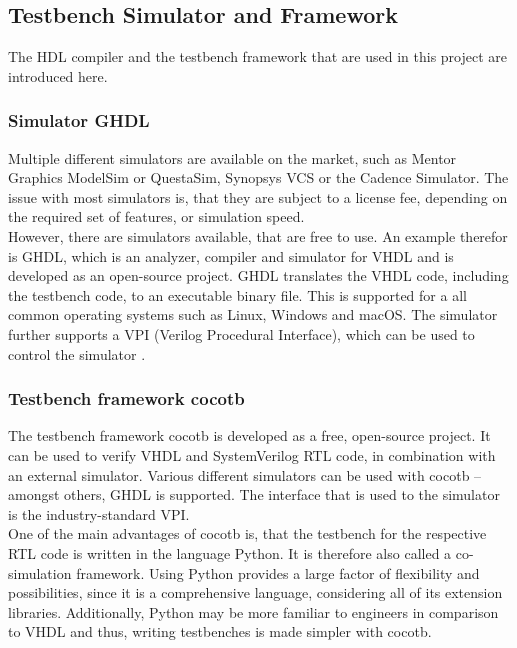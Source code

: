 \subsection{Testbench Simulator and Framework}

The HDL compiler and the testbench framework that are used in this project are introduced here.

\subsubsection{Simulator GHDL}

Multiple different simulators are available on the market, such as Mentor Graphics \mbox{ModelSim} or QuestaSim, Synopsys VCS or the Cadence Simulator.
The issue with most simulators is, that they are subject to a license fee, depending on the required set of features, or simulation speed.\\

However, there are simulators available, that are free to use.
An example therefor is GHDL, which is an analyzer, compiler and simulator for VHDL and is developed as an open-source project.
GHDL translates the VHDL code, including the testbench code, to an executable binary file.
This is supported for a all common operating systems such as Linux, Windows and macOS.
The simulator further supports a VPI (Verilog Procedural Interface), which can be used to control the simulator \cite{GHDLDoc}.

\subsubsection{Testbench framework cocotb}
\label{sub:VHDL:FrameworkCocotb}

The testbench framework cocotb is developed as a free, open-source project.
It can be used to verify VHDL and SystemVerilog RTL code, in combination with an external simulator.
Various different simulators can be used with cocotb -- amongst others, GHDL is supported.
The interface that is used to the simulator is the industry-standard VPI.\\

One of the main advantages of cocotb is, that the testbench for the respective RTL code is written in the language Python.
It is therefore also called a co-simulation framework.
Using Python provides a large factor of flexibility and possibilities, since it is a comprehensive language, considering all of its extension libraries.
Additionally, Python may be more familiar to engineers in comparison to VHDL and thus, writing testbenches is made simpler with cocotb.\\

